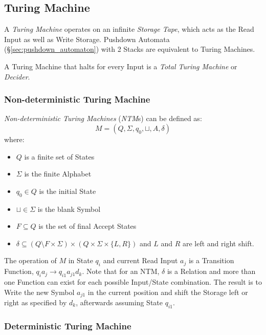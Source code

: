 \subsection{Turing Machine}\label{sec:turing_machine}

A \emph{Turing Machine} operates on an infinite \emph{Storage Tape},
which acts as the Read Input as well as Write Storage. Pushdown
Automata (\S\ref{sec:pushdown_automaton}) with 2 Stacks are equivalent
to Turing Machines.

A Turing Machine that halts for every Input is a \emph{Total Turing
  Machine} or \emph{Decider}.



\subsubsection{Non-deterministic Turing Machine}
\label{sec:nondeterministic_turing_machine}

\emph{Non-deterministic Turing Machines} (\emph{NTM}s) can be defined
as:
\[
  M = (Q, \Sigma, q_0, \sqcup, A, \delta)
\]
where:
\begin{itemize}
  \item $Q$ is a finite set of States
  \item $\Sigma$ is the finite Alphabet
  \item $q_0 \in Q$ is the initial State
  \item $\sqcup \in \Sigma$ is the blank Symbol
  \item $F \subseteq Q$ is the set of final Accept States
  \item $\delta \subseteq (Q \setminus F \times \Sigma) \times (Q
    \times \Sigma \times \{L,R\})$ and $L$ and $R$ are left and right
    shift.
\end{itemize}

The operation of $M$ in State $q_i$ and current Read Input $a_j$ is a
Transition Function, $q_i a_j \rightarrow q_{i1} a_{j1} d_k$. Note
that for an NTM, $\delta$ is a Relation and more than one Function can
exist for each possible Input/State combination. The result is to
Write the new Symbol $a_{j1}$ in the current position and shift the
Storage left or right as specified by $d_k$, afterwards assuming State
$q_{i1}$.



\subsubsection{Deterministic Turing Machine}
\label{sec:deterministic_turing_machine}

